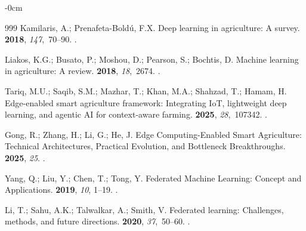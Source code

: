 \documentclass[land,review,accept,pdftex,oneauthor]{Definitions/mdpi}
\begin{document}
\begin{adjustwidth}{-\extralength}{0cm}
\begin{thebibliography}{999}
Kamilaris, A.; Prenafeta-Bold{\'u}, F.X.
\newblock Deep learning in agriculture: A survey.
 {\bf 2018}, {\em
  147},~70--90.
.

Liakos, K.G.; Busato, P.; Moshou, D.; Pearson, S.; Bochtis, D.
\newblock Machine learning in agriculture: A review. %
 {\bf 2018}, {\em 18},~2674.
.

Tariq, M.U.; Saqib, S.M.; Mazhar, T.; Khan, M.A.; Shahzad, T.; Hamam, H.
\newblock Edge-enabled smart agriculture framework: Integrating IoT,
  lightweight deep learning, and agentic AI for context-aware farming.
 {\bf 2025}, {\em 28},~107342.
.

Gong, R.; Zhang, H.; Li, G.; He, J.
\newblock Edge Computing-Enabled Smart Agriculture: Technical Architectures,
  Practical Evolution, and Bottleneck Breakthroughs.
 {\bf 2025}, {\em 25}.
.

Yang, Q.; Liu, Y.; Chen, T.; Tong, Y.
\newblock Federated Machine Learning: Concept and Applications.
 {\bf
  2019}, {\em 10}, 1--19.
.

Li, T.; Sahu, A.K.; Talwalkar, A.; Smith, V.
\newblock Federated learning: Challenges, methods, and future directions.
 {\bf 2020}, {\em 37},~50--60.
.


\end{thebibliography}
\end{adjustwidth}
\end{document}
